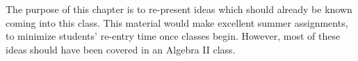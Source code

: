 


The purpose of this chapter is to re-present ideas which should already be known coming into
this class.  This material would make excellent summer assignments, to minimize students' 
re-entry time once classes begin.  However, most of these ideas should have been covered in
an Algebra II class.

\newpage
\chapterminitoc


\newpage

\newpage

\newpage

\newpage

\newpage

\newpage

\newpage

